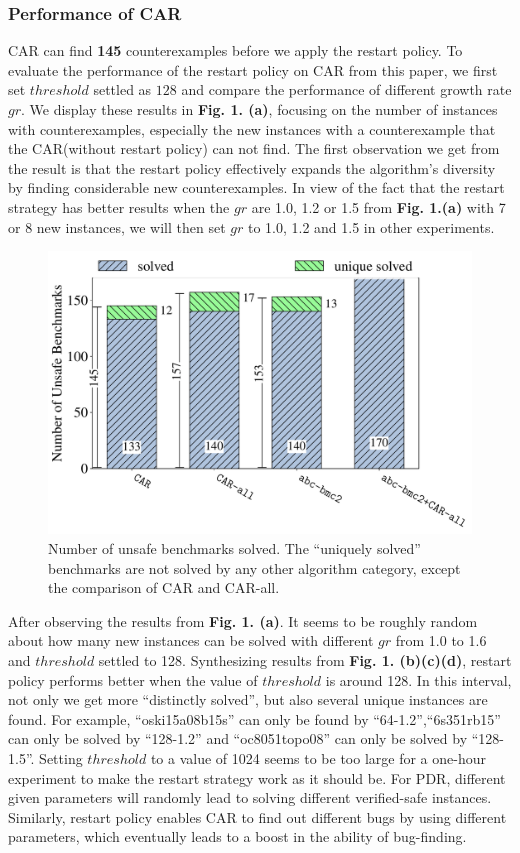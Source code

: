 \subsubsection{Performance of CAR}
CAR can find \textbf{145} counterexamples before we apply the restart policy.
To evaluate the performance of the restart policy on CAR from this paper, we first set $threshold$ settled as $128$ and compare the performance of different growth rate $gr$. We display these results in \textbf{Fig. 1. (a)}, focusing on the number of instances with counterexamples, especially the new instances with a counterexample that the CAR(without restart policy) can not find. The first observation we get from the result is that the restart policy effectively expands the algorithm's diversity by finding considerable new counterexamples. In view of the fact that the restart strategy has better results when the $gr$ are 1.0, 1.2 or 1.5 from \textbf{Fig. 1.(a)} with 7 or 8 new instances, we will then set $gr$ to 1.0, 1.2 and 1.5 in other experiments.
\begin{figure}[!t]
\centering
\includegraphics[width=\linewidth]{images/car-bmc.pdf} 
\caption{Number of unsafe benchmarks solved. The “uniquely solved” benchmarks are not solved by any other algorithm category, except the comparison of CAR and CAR-all.}\label{fig:compare}
\end{figure}
After observing the results from \textbf{Fig. 1. (a)}. It seems to be roughly random about how many new instances can be solved with different $gr$ from 1.0 to 1.6 and $threshold$ settled to 128. Synthesizing results from \textbf{Fig. 1. (b)(c)(d)}, restart policy performs better when the value of $threshold$ is around 128. In this interval, not only we get more ``distinctly solved'', but also several unique instances are found. For example, ``oski15a08b15s'' can only be found by ``64-1.2'',``6s351rb15'' can only be solved by ``128-1.2'' and ``oc8051topo08'' can only be solved by ``128-1.5''. Setting $threshold$ to a value of 1024 seems to be too large for a one-hour experiment to make the restart strategy work as it should be. For PDR, different given parameters will randomly lead to solving different verified-safe instances. Similarly, restart policy enables CAR to find out different bugs by using different parameters, which eventually leads to a boost in the ability of bug-finding.

